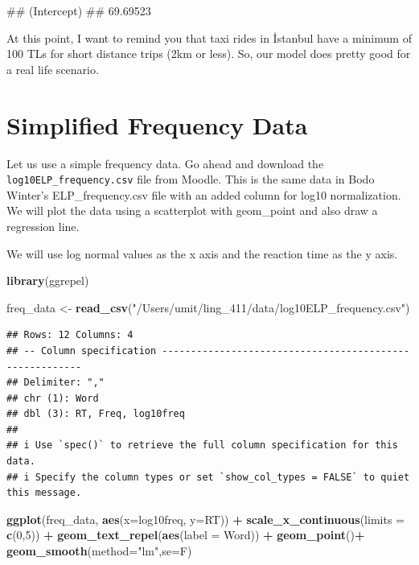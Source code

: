 \documentclass[
]{book}
\newenvironment{Shaded}{\begin{snugshade}}{\end{snugshade}}
\newcommand{\AttributeTok}[1]{\textcolor[rgb]{0.13,0.29,0.53}{#1}}
\newcommand{\DecValTok}[1]{\textcolor[rgb]{0.00,0.00,0.81}{#1}}
\newcommand{\FunctionTok}[1]{\textcolor[rgb]{0.13,0.29,0.53}{\textbf{#1}}}
\newcommand{\NormalTok}[1]{#1}
\newcommand{\OtherTok}[1]{\textcolor[rgb]{0.56,0.35,0.01}{#1}}
\newcommand{\SpecialCharTok}[1]{\textcolor[rgb]{0.81,0.36,0.00}{\textbf{#1}}}
\newcommand{\StringTok}[1]{\textcolor[rgb]{0.31,0.60,0.02}{#1}}
\begin{document}
\begin{Shaded}
\begin{Highlighting}[]
\NormalTok{\#\# (Intercept) }
\NormalTok{\#\#    69.69523}
\end{Highlighting}
\end{Shaded}

At this point, I want to remind you that taxi rides in İstanbul have a minimum of 100 TLs for short distance trips (2km or less). So, our model does pretty good for a real life scenario.

\section{Simplified Frequency Data}\label{simplified-frequency-data}

Let us use a simple frequency data. Go ahead and download the \texttt{log10ELP\_frequency.csv} file from Moodle. This is the same data in Bodo Winter's ELP\_frequency.csv file with an added column for log10 normalization. We will plot the data using a scatterplot with geom\_point and also draw a regression line.

We will use log normal values as the x axis and the reaction time as the y axis.

\begin{Shaded}
\begin{Highlighting}[]
\FunctionTok{library}\NormalTok{(ggrepel)}


\NormalTok{freq\_data }\OtherTok{\textless{}{-}} \FunctionTok{read\_csv}\NormalTok{(}\StringTok{"/Users/umit/ling\_411/data/log10ELP\_frequency.csv"}\NormalTok{)}
\end{Highlighting}
\end{Shaded}

\begin{verbatim}
## Rows: 12 Columns: 4
## -- Column specification --------------------------------------------------------
## Delimiter: ","
## chr (1): Word
## dbl (3): RT, Freq, log10freq
## 
## i Use `spec()` to retrieve the full column specification for this data.
## i Specify the column types or set `show_col_types = FALSE` to quiet this message.
\end{verbatim}

\begin{Shaded}
\begin{Highlighting}[]
\FunctionTok{ggplot}\NormalTok{(freq\_data, }\FunctionTok{aes}\NormalTok{(}\AttributeTok{x=}\NormalTok{log10freq, }\AttributeTok{y=}\NormalTok{RT)) }\SpecialCharTok{+}
  \FunctionTok{scale\_x\_continuous}\NormalTok{(}\AttributeTok{limits =} \FunctionTok{c}\NormalTok{(}\DecValTok{0}\NormalTok{,}\DecValTok{5}\NormalTok{)) }\SpecialCharTok{+}
  \FunctionTok{geom\_text\_repel}\NormalTok{(}\FunctionTok{aes}\NormalTok{(}\AttributeTok{label =}\NormalTok{ Word)) }\SpecialCharTok{+}
  \FunctionTok{geom\_point}\NormalTok{()}\SpecialCharTok{+}
  \FunctionTok{geom\_smooth}\NormalTok{(}\AttributeTok{method=}\StringTok{"lm"}\NormalTok{,}\AttributeTok{se=}\NormalTok{F)}
\end{Highlighting}
\end{Shaded}
\end{document}
